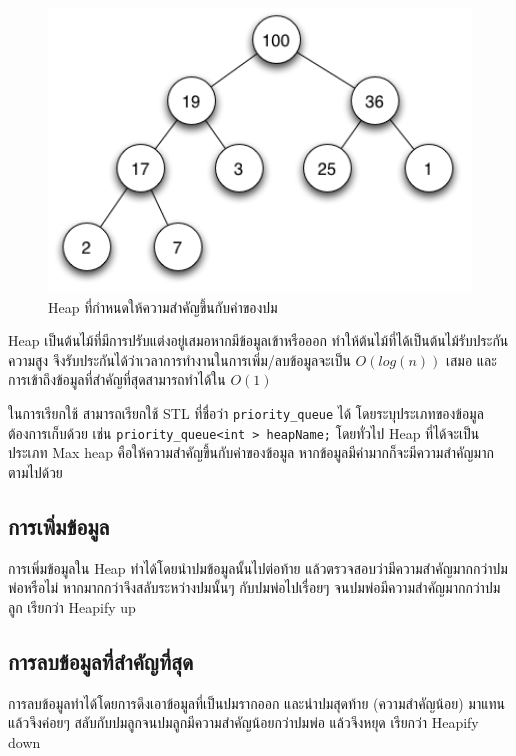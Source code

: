 \begin{figure}[h!]
    \centering
    \includegraphics[width=13cm]{images/max-heap}
    \caption{Heap ที่กำหนดให้ความสำคัญขึ้นกับค่าของปม}
    \label{fig:max-heap}
\end{figure}
Heap เป็นต้นไม้ที่มีการปรับแต่งอยู่เสมอหากมีข้อมูลเข้าหรือออก ทำให้ต้นไม้ที่ได้เป็นต้นไม้รับประกันความสูง จึงรับประกันได้ว่าเวลาการทำงานในการเพิ่ม/ลบข้อมูลจะเป็น $O(log(n))$ เสมอ และการเข้าถึงข้อมูลที่สำคัญที่สุดสามารถทำได้ใน  $O(1)$

ในการเรียกใช้ สามารถเรียกใช้ STL ที่ชื่อว่า \texttt{priority\_queue} ได้ โดยระบุประเภทของข้อมูลต้องการเก็บด้วย เช่น \texttt{priority\_queue<int > heapName;} โดยทั่วไป Heap ที่ได้จะเป็นประเภท Max heap คือให้ความสำคัญขึ้นกับค่าของข้อมูล หากข้อมูลมีค่ามากก็จะมีความสำคัญมากตามไปด้วย

\subsection{การเพิ่มข้อมูล}

การเพิ่มข้อมูลใน Heap ทำได้โดยนำปมข้อมูลนั้นไปต่อท้าย แล้วตรวจสอบว่ามีความสำคัญมากกว่าปมพ่อหรือไม่ หากมากกว่าจึงสลับระหว่างปมนั้นๆ กับปมพ่อไปเรื่อยๆ จนปมพ่อมีความสำคัญมากกว่าปมลูก เรียกว่า Heapify up

\subsection{การลบข้อมูลที่สำคัญที่สุด}

การลบข้อมูลทำได้โดยการดึงเอาข้อมูลที่เป็นปมรากออก และนำปมสุดท้าย (ความสำคัญน้อย) มาแทน แล้วจึงค่อยๆ สลับกับปมลูกจนปมลูกมีความสำคัญน้อยกว่าปมพ่อ แล้วจึงหยุด 
เรียกว่า Heapify down

